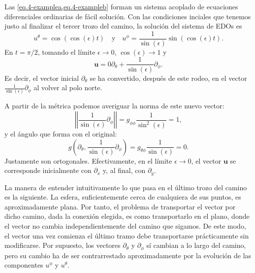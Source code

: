 \begin{example}
    Las \cref{eq.4-examplea,eq.4-exampleb} forman un sistema acoplado de ecuaciones diferenciales ordinarias de fácil solución. Con las condiciones inciales que tenemos justo al finalizar el tercer trozo del camino, la solución del sistema de EDOs es
    \begin{equation*}
        u^\theta = \cos(\cos(\epsilon)t)\quad\text{y}\quad u^\phi = \frac{1}{\sin(\epsilon)}\sin(\cos(\epsilon)t).
    \end{equation*}
    En \(t = \pi/2\), tomando el límite \(\epsilon\rightarrow 0\), \(\cos(\epsilon)\rightarrow 1\) y
    \begin{equation*}
        \mathbf{u} = 0 \partial_\theta + \frac{1}{\sin(\epsilon)} \partial_\phi.
    \end{equation*}
    Es decir, el vector inicial \(\partial_\theta\) se ha convertido, después de este rodeo, en el vector \(\frac{1}{\sin(\epsilon)}\partial_\phi\) al volver al polo norte. 
    
    A partir de la métrica podemos averiguar la norma de este nuevo vector:
    \begin{equation*}
        \left|\left|\frac{1}{\sin(\epsilon)}\partial_\phi\right|\right| = g_{\phi\phi}\frac{1}{\sin^2(\epsilon)} = 1,
    \end{equation*}
    y el ángulo que forma con el original:
    \begin{equation*}
        g\left(\partial_\theta,\frac{1}{\sin(\epsilon)}\partial_\phi\right) = g_{\theta\phi}\frac{1}{\sin(\epsilon)} = 0.
    \end{equation*}
    Justamente son ortogonales. Efectivamente, en el límite \(\epsilon\rightarrow0\), el vector \(\mathbf{u}\) se corresponde inicialmente con \(\partial_x\) y, al final, con \(\partial_y\).

    La manera de entender intuitivamente lo que pasa en el último trozo del camino es la siguiente. La esfera, suficientemente cerca de cualquiera de sus puntos, es aproximadamente plana. Por tanto, el problema de transportar el vector por dicho camino, dada la conexión elegida, es como transportarlo en el plano, donde el vector no cambia independientemente del camino que sigamos. De este modo, el vector una vez comienza el último tramo debe transportarse prácticamente sin modificarse. Por supuesto, los vectores \(\partial_\theta\) y \(\partial_\phi\) sí cambian a lo largo del camino, pero su cambio ha de ser contrarrestado aproximadamente por la evolución de las componentes \(u^\phi\) y \(u^\theta\).

\end{example}


